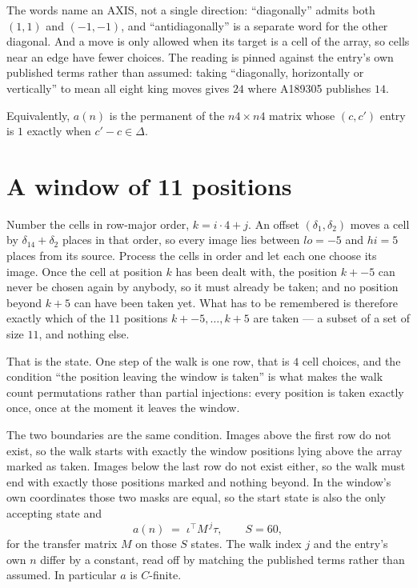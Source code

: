 \documentclass[11pt,a4paper]{article}
\theoremstyle{plain}
\theoremstyle{definition}
\begin{document}
The words name an AXIS, not a single direction: ``diagonally'' admits
both $(1,1)$ and $(-1,-1)$, and ``antidiagonally'' is a separate word for the other diagonal.
And a move is only allowed when its target is a cell of the array, so cells near an
edge have fewer choices. The reading is pinned against the entry's own published terms rather
than assumed: taking ``diagonally, horizontally or vertically'' to mean all eight king moves
gives $24$ where A189305 publishes $14$.

Equivalently, $a(n)$ is the permanent of the $n4\times n4$ matrix whose $(c,c')$ entry is
$1$ exactly when $c'-c\in\Delta$.

\section{A window of 11 positions}

Number the cells in row-major order, $k=i\cdot4+j$. An offset $(\delta_1,\delta_2)$ moves a
cell by $\delta_14+\delta_2$ places in that order, so every image lies between $lo=-5$ and
$hi=5$ places from its source. Process the cells in order and let each one choose its image.
Once the cell at position $k$ has been dealt with, the position $k+-5$ can never be chosen
again by anybody, so it must already be taken; and no position beyond $k+5$ can have been
taken yet. What has to be remembered is therefore exactly which of the $11$ positions
$k+-5,\dots,k+5$ are taken --- a subset of a set of size $11$, and nothing else.

That is the state. One step of the walk is one row, that is $4$ cell choices, and the
condition ``the position leaving the window is taken'' is what makes the walk count permutations
rather than partial injections: every position is taken exactly once, once at the moment it
leaves the window.

The two boundaries are the same condition. Images above the first row do not exist, so the walk
starts with exactly the window positions lying above the array marked as taken. Images below the
last row do not exist either, so the walk must end with exactly those positions marked and
nothing beyond. In the window's own coordinates those two masks are equal, so the start state is
also the only accepting state and
\[
a(n)\;=\;\iota^{\!\top}M^{\,j}\tau ,\qquad S=60,
\]
for the transfer matrix $M$ on those $S$ states. The walk index $j$ and the entry's own $n$
differ by a constant, read off by matching the published terms rather than assumed. In
particular $a$ is $C$-finite.
\end{document}
